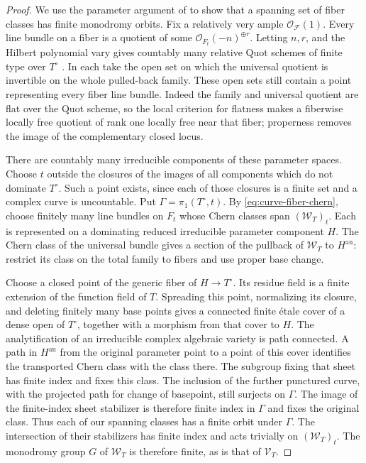 \documentclass[11pt]{amsart}
\theoremstyle{definition}
\theoremstyle{remark}
\numberwithin{equation}{section}
\begin{document}
\begin{proof}
We use the parameter argument of
\cite[Section~6.1, proof of Lemma~6.4]{ProjectiveLCFourfolds} to show
that a spanning set of fiber classes has finite monodromy orbits.  Fix a
relatively very ample \(\mathcal O_{\mathcal F}(1)\).  Every line bundle on a
fiber is a quotient of some
\(\mathcal O_{F_t}(-n)^{\oplus r}\).  Letting \(n,r\), and the Hilbert
polynomial vary gives countably many relative Quot schemes of finite
type over \(T^\circ\)
\cite[Theorems~3.1--3.2]{GrothendieckHilbert1961}.  In each take the
open set on which the universal quotient is invertible on the whole
pulled-back family.  These open sets still contain a point representing
every fiber line bundle.  Indeed the family and universal quotient are
flat over the Quot scheme, so the local criterion for flatness makes a
fiberwise locally free quotient of rank one locally free near that
fiber; properness removes the image of the complementary closed locus.

There are countably many irreducible components of these parameter
spaces.  Choose \(t\) outside the closures of the images of all
components which do not dominate \(T^\circ\).  Such a point exists,
since each of those closures is a finite set and a complex curve is
uncountable.  Put \(\Gamma=\pi_1(T^\circ,t)\).  By
\eqref{eq:curve-fiber-chern}, choose finitely many
line bundles on \(F_t\) whose Chern classes span
\((\mathcal W_T)_t\).  Each is represented on a dominating
reduced irreducible parameter component \(H\).  The Chern class of the
universal bundle gives a section of the pullback of \(\mathcal W_T\)
to \(H^{\mathrm{an}}\): restrict its class on the total family to
fibers and use proper base change.

Choose a closed point of the generic fiber of \(H\to T^\circ\).
Its residue field is a finite extension of the function field of
\(T\).  Spreading this point, normalizing its closure, and deleting
finitely many base points gives a connected finite \'etale cover of a
dense open of \(T^\circ\), together with a morphism from that cover
to \(H\).  The analytification of an
irreducible complex algebraic variety is path connected.  A path in
\(H^{\mathrm{an}}\) from the original parameter point to a point of
this cover identifies the transported Chern class with the class
there.  The subgroup fixing that sheet has finite index and fixes
this class.  The inclusion of the further punctured curve, with the
projected path for change of basepoint, still surjects on \(\Gamma\).
The image of the finite-index sheet stabilizer is therefore finite
index in \(\Gamma\) and fixes the original class.  Thus each of our
spanning classes has a finite orbit under \(\Gamma\).  The intersection
of their stabilizers has finite index and acts trivially on
\((\mathcal W_T)_t\).  The monodromy group \(G\) of \(\mathcal W_T\)
is therefore finite, as is that of \(\mathcal V_T\).


\end{proof}
\end{document}
